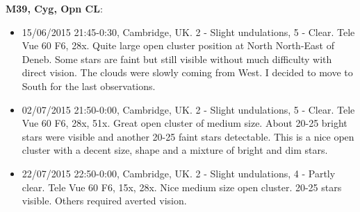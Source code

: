 {\bf M39, Cyg, Opn CL}:
\begin{itemize}
\item 15/06/2015 21:45-0:30, Cambridge, UK. 2 - Slight undulations, 5 - Clear. Tele Vue 60 F6, 28x. Quite large open cluster position at North North-East of Deneb. Some stars are faint but still visible without much difficulty with direct vision. The clouds were slowly coming from West. I decided to move to South for the last observations.
\item 02/07/2015 21:50-0:00, Cambridge, UK. 2 - Slight undulations, 5 - Clear. Tele Vue 60 F6, 28x, 51x. Great open cluster of medium size. About 20-25 bright stars were visible and another 20-25 faint stars detectable. This is a nice open cluster with a decent size, shape and a mixture of bright and dim stars.
\item 22/07/2015 22:50-0:00, Cambridge, UK. 2 - Slight undulations, 4 - Partly clear. Tele Vue 60 F6, 15x, 28x. Nice medium size open cluster. 20-25 stars visible. Others required averted vision.
\end{itemize}
